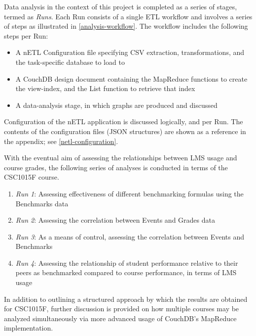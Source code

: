 Data analysis in the context of this project is completed as a series of stages, termed as \textit{Runs}. Each Run consists of a single ETL workflow and involves a series of steps as illustrated in \ref{analysis-workflow}. The workflow includes the following steps per Run:

\begin{itemize}
    \item A nETL Configuration file specifying CSV extraction, transformations, and the task-specific database to load to
    \item A CouchDB design document containing the MapReduce functions to create the view-index, and the List function to retrieve that index
    \item A data-analysis stage, in which graphs are produced and discussed
\end{itemize}


Configuration of the nETL application is discussed logically, and per Run. The contents of the configuration files (JSON structures) are shown as a reference in the appendix; see \ref{netl-configuration}.

With the eventual aim of assessing the relationships between LMS usage and course grades, the following series of analyses is conducted in terms of the CSC1015F course.

\begin{enumerate}
    \item \textit{Run 1}: Assessing effectiveness of different benchmarking formulas using the Benchmarks data
    \item \textit{Run 2}: Assessing the correlation between Events and Grades data
    \item \textit{Run 3}: As a means of control, assessing the correlation between Events and Benchmarks
    \item \textit{Run 4}: Assessing the relationship of student performance relative to their peers as benchmarked compared to course performance, in terms of LMS usage
\end{enumerate}

In addition to outlining a structured approach by which the results are obtained for CSC1015F, further discussion is provided on how multiple courses may be analyzed simultaneously via more advanced usage of CouchDB's MapReduce implementation.




